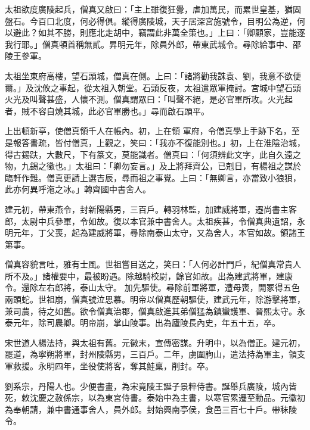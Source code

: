 \begin{pinyinscope}
 太祖欲度廣陵起兵，僧真又啟曰：「主上雖復狂釁，虐加萬民，而累世皇基，猶固盤石。今百口北度，何必得俱。縱得廣陵城，天子居深宮施號令，目明公為逆，何以避此？如其不勝，則應北走胡中，竊謂此非萬全策也。」上曰：「卿顧家，豈能逐我行耶。」僧真頓首稱無貳。昇明元年，除員外郎，帶東武城令。尋除給事中、邵陵王參軍。



 太祖坐東府高樓，望石頭城，僧真在側。上曰：「諸將勸我誅袁、劉，我意不欲便爾。」及沈攸之事起，從太祖入朝堂。石頭反夜，太祖遣眾軍掩討。宮城中望石頭火光及叫聲甚盛，人懷不測。僧真謂眾曰：「叫聲不絕，是必官軍所攻。火光起者，賊不容自燒其城，此必官軍勝也。」尋而啟石頭平。



 上出頓新亭，使僧真領千人在帳內。初，上在領
 軍府，令僧真學上手跡下名，至是報答書疏，皆付僧真，上觀之，笑曰：「我亦不復能別也。」初，上在淮陰治城，得古錫趺，大數尺，下有篆文，莫能識者。僧真曰：「何須辨此文字，此自久遠之物，九錫之徵也。」太祖曰：「卿勿妄言。」及上將拜齊公，已剋日，有楊祖之謀於臨軒作難。僧真更請上選吉辰，尋而祖之事覺。上曰：「無卿言，亦當致小狼狽，此亦何異呼沲之冰。」轉齊國中書舍人。



 建元初，帶東燕令，封新陽縣男，三百戶。轉羽林監，加建威將軍，遷尚書主客郎，太尉中兵參軍，令如故。復以本官兼中書舍人。太祖疾甚，令僧真典遺詔，永明元年，丁父喪，起為建威將軍，尋除南泰山太守，又為舍人，本官如故。領諸王第事。



 僧真容貌言吐，雅有士風。世祖嘗目送之，笑曰：「人何必計門戶，紀僧真常貴人所不及。」諸權要中，最被盼遇。除越騎校尉，餘官如故。出為建武將軍，建康令。還除左右郎將，泰山太守。
 加先驅使。尋除前軍將軍，遭母喪，開冢得五色兩頭蛇。世祖崩，僧真號泣思慕。明帝以僧真歷朝驅使，建武元年，除游擊將軍，兼司農，待之如舊。欲令僧真治郡，僧真啟進其弟僧猛為鎮蠻護軍、晉熙太守。永泰元年，除司農卿。明帝崩，掌山陵事。出為廬陵長內史，年五十五，卒。



 宋世道人楊法持，與太祖有舊。元徽末，宣傳密謀。升明中，以為僧正。建元初，罷道，為寧朔將軍，封州陵縣男，三百戶。二年，虜圍朐山，遣法持為軍主，領支軍救援。永明四年，坐役使將客，奪其鮭稟，削封。卒。



 劉系宗，丹陽人也。少便書畫，為宋竟陵王誕子景粹侍書。誕舉兵廣陵，城內皆死，敕沈慶之赦係宗，以為東宮侍書。泰始中為主書，以寒官累遷至勳品。元徽初為奉朝請，兼中書通事舍人，員外郎。封始興南亭侯，食邑三百七十戶。帶秣陵令。




\end{pinyinscope}
